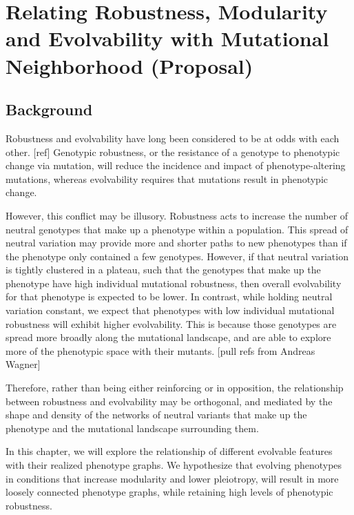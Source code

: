 \section{Relating Robustness, Modularity and Evolvability with  Mutational Neighborhood (Proposal)}

\subsection{Background}

Robustness and evolvability have long been considered to be at odds with each other. [ref] Genotypic robustness, or the resistance of a genotype to phenotypic change via mutation, will reduce the incidence and impact of phenotype-altering mutations, whereas evolvability requires that mutations result in phenotypic change.

However, this conflict may be illusory. Robustness acts to increase the number of neutral genotypes that make up a phenotype within a population. This spread of neutral variation may provide more and shorter paths to new phenotypes than if the phenotype only contained a few genotypes. However, if that neutral variation is tightly clustered in a plateau, such that the genotypes that make up the phenotype have high individual mutational robustness, then overall evolvability for that phenotype is expected to be lower. In contrast, while holding neutral variation constant, we expect that phenotypes with low individual mutational robustness will exhibit higher evolvability. This is because those genotypes are spread more broadly along the mutational landscape, and are able to explore more of the phenotypic space with their mutants. [pull refs from Andreas Wagner]

Therefore, rather than being either reinforcing or in opposition, the relationship between robustness and evolvability may be orthogonal, and mediated by the shape and density of the networks of neutral variants that make up the phenotype and the mutational landscape surrounding them. 

In this chapter, we will explore the relationship of different evolvable features with their realized phenotype graphs. We hypothesize that evolving phenotypes in conditions that increase modularity and lower pleiotropy, will result in more loosely connected phenotype graphs, while retaining high levels of phenotypic robustness.
